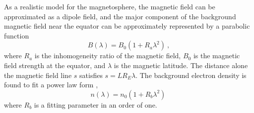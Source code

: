 As a realistic model for the magnetosphere, the magnetic field can be approximated as a dipole field, and the major component of the background magnetic field near the equator can be approximately represented by a parabolic function \cite{tao_numerical_2014}
\begin{equation}
    B(\lambda) = B_0(1+ R_a \lambda ^2)~,
\end{equation}
where $R_a$ is the inhomogeneity ratio of the magnetic field, $B_0$ is the magnetic field strength at the equator, and $\lambda$ is the magnetic latitude. The distance alone the magnetic field line $s$ satisfies $s = L R_E \lambda$.
The background electron density is found to fit a power law form \cite{denton2004},
\begin{equation}
    n(\lambda) = n_0 (1+R_b \lambda^2)~
\end{equation}
where $R_b$ is a fitting parameter in an order of one.

